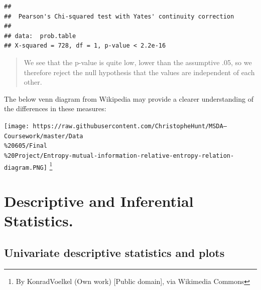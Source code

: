 \documentclass[]{article}
\newenvironment{Shaded}{\begin{snugshade}}{\end{snugshade}}
\newcommand{\KeywordTok}[1]{\textcolor[rgb]{0.13,0.29,0.53}{\textbf{{#1}}}}
\newcommand{\StringTok}[1]{\textcolor[rgb]{0.31,0.60,0.02}{{#1}}}
\newcommand{\NormalTok}[1]{{#1}}
\let\rmarkdownfootnote\footnote%
\def\footnote{\protect\rmarkdownfootnote}
\begin{document}
\begin{Shaded}
\end{Shaded}

\begin{verbatim}
## 
##  Pearson's Chi-squared test with Yates' continuity correction
## 
## data:  prob.table
## X-squared = 728, df = 1, p-value < 2.2e-16
\end{verbatim}

\begin{quote}
We see that the p-value is quite low, lower than the assumptive .05, so
we therefore reject the null hypothesis that the values are independent
of each other.
\end{quote}

The below venn diagram from Wikipedia may provide a clearer
understanding of the differences in these measures:

\texttt{[image: https://raw.githubusercontent.com/ChristopheHunt/MSDA---Coursework/master/Data\\\%20605/Final\\\%20Project/Entropy-mutual-information-relative-entropy-relation-diagram.PNG]}
\footnote{By KonradVoelkel (Own work) {[}Public domain{]}, via Wikimedia
  Commons}

\newpage

\section{Descriptive and Inferential
Statistics.}\label{descriptive-and-inferential-statistics.}

\subsection{Univariate descriptive statistics and
plots}\label{univariate-descriptive-statistics-and-plots}
\end{document}
